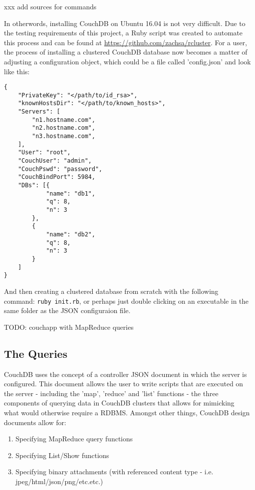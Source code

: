 xxx add sources for commands

In otherwords, installing CouchDB on Ubuntu 16.04 is not very difficult. Due to the testing requirements of this project, a Ruby script was created to automate this process and can be found at \url{https://github.com/zachsa/rcluster}. For a user, the process of installing a clustered CouchDB database now becomes a matter of adjusting a configuration object, which could be a file called 'config.json' and look like this:

\begin{verbatim}
{
    "PrivateKey": "</path/to/id_rsa>",
    "knownHostsDir": "</path/to/known_hosts>",
    "Servers": [
        "n1.hostname.com",
        "n2.hostname.com",
        "n3.hostname.com",
    ],
    "User": "root",
    "CouchUser": "admin",
    "CouchPswd": "password",
    "CouchBindPort": 5984,
    "DBs": [{
            "name": "db1",
            "q": 8,
            "n": 3
        },
        {
            "name": "db2",
            "q": 8,
            "n": 3
        }
    ]
}
\end{verbatim}

And then creating a clustered database from scratch with the following command: \texttt{ruby init.rb}, or perhaps just double clicking on an executable in the same folder as the JSON configuraion file.

TODO: couchapp with MapReduce queries

\subsection{The Queries}

CouchDB uses the concept of a controller JSON document in which the server is configured. This document allows the user to write scripts that are executed on the server - including the 'map', 'reduce' and 'list' functions - the three components of querying data in CouchDB clusters that allows for mimicking what would otherwise require a RDBMS. Amongst other things, CouchDB design documents allow for:

\begin{enumerate}
    \item Specifying MapReduce query functions
    \item Specifying List/Show functions
    \item Specifying binary attachments (with referenced content type - i.e. jpeg/html/json/png/etc.etc.)
\end{enumerate}


